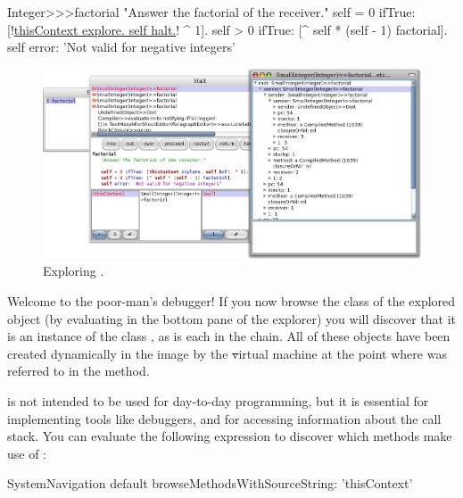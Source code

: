 \documentclass[a4paper,10pt,twoside]{book}
\begin{document}
\begin{code}{}
Integer>>>factorial
	"Answer the factorial of the receiver."
	self = 0 ifTrue: [!\underline{thisContext explore. self halt.}! ^ 1].
	self > 0 ifTrue: [^ self * (self - 1) factorial].
	self error: 'Not valid for negative integers'
\end{code}


\begin{figure}[ht]\centering
	\includegraphics[width=\linewidth]{exploringThisContext}
	\caption{Exploring .\label{fig:exploringThisContext}}
\end{figure}

Welcome to the poor-man's debugger!
If you now browse the class of the explored object (\ie by evaluating  in the bottom pane of the explorer) you will discover that it is an instance of the class , as is each  in the chain. All of these objects have been created dynamically in the image by the \st virtual machine at the point where  was referred to in the  method. 

 is not intended to be used for day-to-day programming, but it is essential for implementing tools like debuggers, and for accessing information about the call stack.
You can evaluate the following expression to discover which methods make use of :

\begin{code}{}
SystemNavigation default browseMethodsWithSourceString: 'thisContext'
\end{code}
\end{document}

